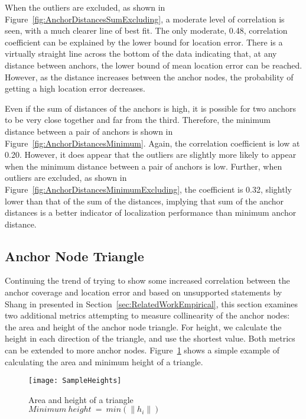 When the outliers are excluded, as shown in Figure~\ref{fig:AnchorDistancesSumExcluding}, a moderate level of correlation is seen, with a much clearer line of best fit.  The only moderate, 0.48, correlation coefficient can be explained by the lower bound for location error.  There is a virtually straight line across the bottom of the data indicating that, at any distance between anchors, the lower bound of mean location error can be reached.  However, as the distance increases between the anchor nodes, the probability of getting a high location error decreases.

Even if the sum of distances of the anchors is high, it is possible for two anchors to be very close together and far from the third.  Therefore, the minimum distance between a pair of anchors is shown in Figure~\ref{fig:AnchorDistancesMinimum}.  Again, the correlation coefficient is low at 0.20.  However, it does appear that the outliers are slightly more likely to appear when the minimum distance between a pair of anchors is low.  Further, when outliers are excluded, as shown in Figure~\ref{fig:AnchorDistancesMinimumExcluding}, the coefficient is 0.32, slightly lower than that of the sum of the distances, implying that sum of the anchor distances is a better indicator of localization performance than minimum anchor distance.

\subsection{Anchor Node Triangle}
\label{sec:anchorTriangle}
Continuing the trend of trying to show some increased correlation between the anchor coverage and location error and based on unsupported statements by Shang in \cite[p. 964]{MDS-MAP} presented in Section~\ref{sec:RelatedWorkEmpirical}, this section examines two additional metrics attempting to measure collinearity of the anchor nodes: the area and height of the anchor node triangle.  For height, we calculate the height in each direction of the triangle, and use the shortest value.  Both metrics can be extended to more anchor nodes.  Figure~\ref{fig:SampleHeights} shows a simple example of calculating the area and minimum height of a triangle.

\begin{figure}
  \centering
	\texttt{[image: SampleHeights]}
	\caption[Area and height of a triangle]{Area and height of a triangle \\ 
	$Minimum~height~=~min(\| h_i \|)$}
	\label{fig:SampleHeights}
\end{figure}


